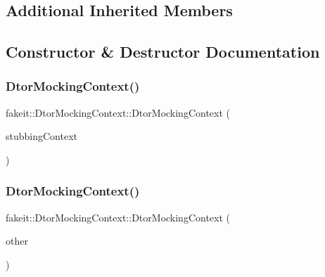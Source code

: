 \subsection*{Additional Inherited Members}


\subsection{Constructor \& Destructor Documentation}
\mbox{\label{classfakeit_1_1DtorMockingContext_a81c785463a44f396c4c3e5e0e1c9e40d}} 
\subsubsection{\texorpdfstring{DtorMockingContext()}{DtorMockingContext()}\hspace{0.1cm}{\footnotesize\ttfamily [1/27]}}
{\footnotesize\ttfamily fakeit\+::\+Dtor\+Mocking\+Context\+::\+Dtor\+Mocking\+Context (\begin{DoxyParamCaption}\item[{\mbox{\hyperlink{classfakeit_1_1MethodMockingContext}{Method\+Mocking\+Context}}$<$ void $>$\+::Context $\ast$}]{stubbing\+Context }\end{DoxyParamCaption})\hspace{0.3cm}{\ttfamily [inline]}}

\mbox{\label{classfakeit_1_1DtorMockingContext_a03939798c9836d082d94fe4e84d3dcd3}} 
\subsubsection{\texorpdfstring{DtorMockingContext()}{DtorMockingContext()}\hspace{0.1cm}{\footnotesize\ttfamily [2/27]}}
{\footnotesize\ttfamily fakeit\+::\+Dtor\+Mocking\+Context\+::\+Dtor\+Mocking\+Context (\begin{DoxyParamCaption}\item[{\mbox{\hyperlink{classfakeit_1_1DtorMockingContext}{Dtor\+Mocking\+Context}} \&}]{other }\end{DoxyParamCaption})\hspace{0.3cm}{\ttfamily [inline]}}

